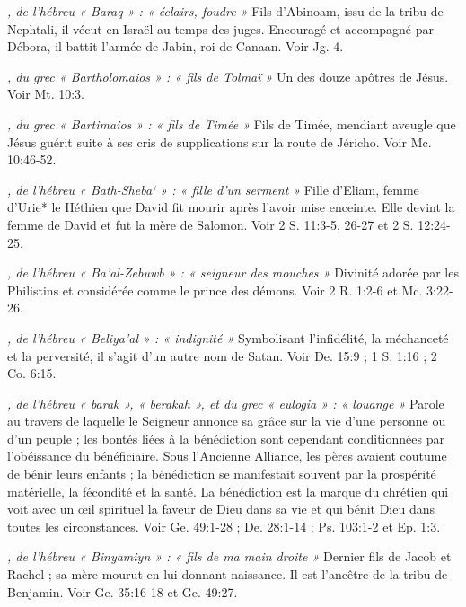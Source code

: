 \begin{multicols}{2}
\textit{, de l'hébreu « Baraq » : « éclairs, foudre »}\newline
Fils d'Abinoam, issu de la tribu de Nephtali, il vécut en Israël au temps des juges. Encouragé et accompagné par Débora, il battit l'armée de Jabin, roi de Canaan. Voir Jg. 4.

\textit{, du grec « Bartholomaios » : « fils de Tolmaï »}\newline
Un des douze apôtres de Jésus. Voir Mt. 10:3.

\textit{, du grec « Bartimaios » : « fils de Timée »}\newline
Fils de Timée, mendiant aveugle que Jésus guérit suite à ses cris de supplications sur la route de Jéricho. Voir Mc. 10:46-52.

\textit{, de l'hébreu « Bath-Sheba` » : « fille d'un serment »}\newline
Fille d'Eliam, femme d'Urie* le Héthien que David fit mourir après l'avoir mise enceinte. Elle devint la femme de David et fut la mère de Salomon. Voir 2 S. 11:3-5, 26-27 et 2 S. 12:24-25.

\textit{, de l'hébreu « Ba'al-Zebuwb » : « seigneur des mouches »}\newline
Divinité adorée par les Philistins et considérée comme le prince des démons. Voir 2 R. 1:2-6 et Mc. 3:22-26.

\textit{, de l'hébreu « Beliya'al » : « indignité »}\newline
Symbolisant l'infidélité, la méchanceté et la perversité, il s'agit d'un autre nom de Satan. Voir De. 15:9 ; 1 S. 1:16 ; 2 Co. 6:15.

\textit{, de l'hébreu « barak », « berakah », et du grec « eulogia » : « louange »}\newline
Parole au travers de laquelle le Seigneur annonce sa grâce sur la vie d'une personne ou d'un peuple ; les bontés liées à la bénédiction sont cependant conditionnées par l'obéissance du bénéficiaire. Sous l'Ancienne Alliance, les pères avaient coutume de bénir leurs enfants ; la bénédiction se manifestait souvent par la prospérité matérielle, la fécondité et la santé. La bénédiction est la marque du chrétien qui voit avec un œil spirituel la faveur de Dieu dans sa vie et qui bénit Dieu dans toutes les circonstances. Voir Ge. 49:1-28 ; De. 28:1-14 ; Ps. 103:1-2 et Ep. 1:3.

\textit{, de l'hébreu « Binyamiyn » : « fils de ma main droite »}\newline
Dernier fils de Jacob et Rachel ; sa mère mourut en lui donnant naissance. Il est l'ancêtre de la tribu de Benjamin. Voir Ge. 35:16-18 et Ge. 49:27.


\end{multicols}
